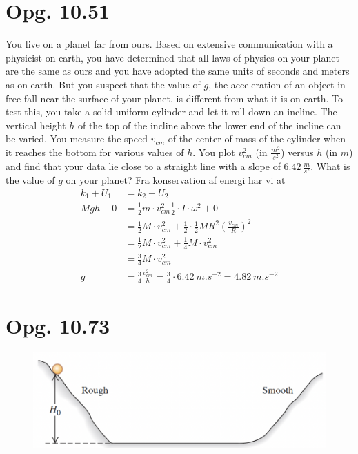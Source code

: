 \documentclass[12pt]{article}
\begin{document}
\section*{Opg. 10.51}
You live on a planet far from ours. Based on extensive communication with a physicist on earth, you have determined that all laws of physics on your planet are the same as ours and you have adopted the same units of seconds and meters as on earth. But you suspect that the value of $g$, the acceleration of an object in free fall near the surface of your planet, is different from what it is on earth. To test this, you take a solid uniform cylinder and let it roll down an incline. The vertical height $h$ of the top of the incline above the lower end of the incline can be varied. You measure the speed $v_{cm}$ of the center of mass of the cylinder when it reaches the bottom for various values of $h$. You plot $v_{cm}^2$ (in $\unit{\frac{m^2}{s^2}}$) versus $h$ (in $\unit{m}$) and find that your data lie close to a straight line with a slope of $\qty{6,42}{\frac{m}{s^2}}$. What is the value of $g$ on your planet?
\bigbreak
Fra konservation af energi har vi at
\begin{align*}
  k_1 + U_1 &= k_2 + U_2 \\
  Mgh  + 0 &= \frac{1}{2}m\cdot v_{cm}^2 \frac{1}{2}\cdot I\cdot \omega^2 + 0 \\
  &= \frac{1}{2}M\cdot v_{cm}^2 + \frac{1}{2}\cdot \frac{1}{2}MR^2\left( \frac{v_{cm}}{R}  \right)^2    \\
  &= \frac{1}{2}M\cdot v_{cm}^2 + \frac{1}{4}M\cdot v_{cm}^2  \\
  &= \frac{3}{4}M\cdot v_{cm}^2 \\
  g &= \frac{3}{4} \frac{v_{cm}^2}{h} = \frac{3}{4}\cdot \qty{6,42}{m.s^{-2}} = \qty{4,82}{m.s^{-2}}
\end{align*}


\section*{Opg. 10.73}
\begin{figure} [ht]
  \centering
  \caption{}
  \includegraphics[width=0.5\linewidth]{../figures/P10_73.png}
  \label{fig:P10_73}
\end{figure}
\end{document}
